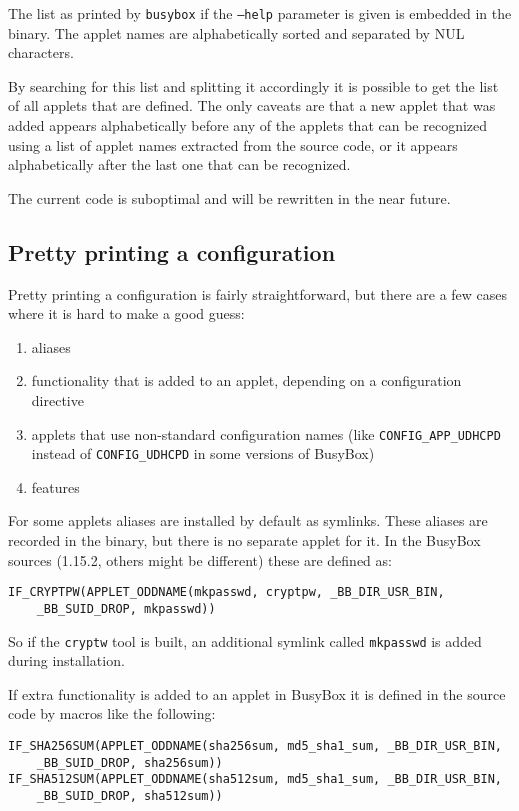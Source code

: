 \documentclass[10pt]{article}
\begin{document}
The list as printed by \texttt{busybox} if the \texttt{--help} parameter is
given is embedded in the binary. The applet names are alphabetically sorted
and separated by NUL characters.

By searching for this list and splitting it accordingly it is possible to get
the list of all applets that are defined. The only caveats are that a new
applet that was added appears alphabetically before any of the applets that
can be recognized using a list of applet names extracted from the source code,
or it appears alphabetically after the last one that can be recognized.

The current code is suboptimal and will be rewritten in the near future.

\subsection{Pretty printing a configuration}

Pretty printing a configuration is fairly straightforward, but there are a few
cases where it is hard to make a good guess:

\begin{enumerate}
\item aliases
\item functionality that is added to an applet, depending on a configuration
directive
\item applets that use non-standard configuration names (like
\texttt{CONFIG\_APP\_UDHCPD} instead of \texttt{CONFIG\_UDHCPD} in some
versions of BusyBox)
\item features
\end{enumerate}

For some applets aliases are installed by default as symlinks. These aliases
are recorded in the binary, but there is no separate applet for it. In the
BusyBox sources (1.15.2, others might be different) these are defined as:

\begin{verbatim}
IF_CRYPTPW(APPLET_ODDNAME(mkpasswd, cryptpw, _BB_DIR_USR_BIN,
    _BB_SUID_DROP, mkpasswd))
\end{verbatim}

So if the \texttt{cryptw} tool is built, an additional symlink called
\texttt{mkpasswd} is added during installation.

If extra functionality is added to an applet in BusyBox it is defined in the
source code by macros like the following:

\begin{verbatim}
IF_SHA256SUM(APPLET_ODDNAME(sha256sum, md5_sha1_sum, _BB_DIR_USR_BIN,
    _BB_SUID_DROP, sha256sum))
IF_SHA512SUM(APPLET_ODDNAME(sha512sum, md5_sha1_sum, _BB_DIR_USR_BIN,
    _BB_SUID_DROP, sha512sum))
\end{verbatim}
\end{document}

